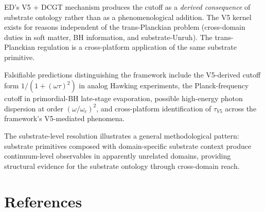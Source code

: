 \documentclass[11pt,a4paper]{article}
\begin{document}
ED's V5 + DCGT mechanism produces the cutoff as a \emph{derived consequence} of substrate ontology rather than as a phenomenological addition. The V5 kernel exists for reasons independent of the trans-Planckian problem (cross-domain duties in soft matter, BH information, and substrate-Unruh). The trans-Planckian regulation is a cross-platform application of the same substrate primitive.

Falsifiable predictions distinguishing the framework include the V5-derived cutoff form $1/(1+(\omega\tau)^{2})$ in analog Hawking experiments, the Planck-frequency cutoff in primordial-BH late-stage evaporation, possible high-energy photon dispersion at order $(\omega/\omega_c)^{2}$, and cross-platform identification of $\tau_{V5}$ across the framework's V5-mediated phenomena.

The substrate-level resolution illustrates a general methodological pattern: substrate primitives composed with domain-specific substrate context produce continuum-level observables in apparently unrelated domains, providing structural evidence for the substrate ontology through cross-domain reach.

\section*{References}
\end{document}
